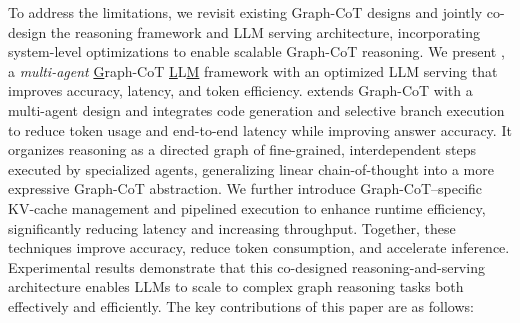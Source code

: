 %
To address the limitations, we revisit existing Graph-CoT designs and jointly co-design the reasoning framework and LLM serving architecture, incorporating system-level optimizations to enable scalable Graph-CoT reasoning.
%
We present \textbf{\projectname}, a \textit{multi-agent} \underline{G}raph-CoT \underline{L}L\underline{M} framework with an optimized LLM serving that improves accuracy, latency, and token efficiency. 
%
\projectname extends Graph-CoT with a multi-agent design and integrates code generation and selective branch execution to reduce token usage and end-to-end latency while improving answer accuracy. 
%
It organizes reasoning as a directed graph of fine-grained, interdependent steps executed by specialized agents, generalizing linear chain-of-thought into a more expressive Graph-CoT abstraction. 
%
We further introduce Graph-CoT–specific KV-cache management and pipelined execution to enhance runtime efficiency, significantly reducing latency and increasing throughput. 
%
Together, these techniques improve accuracy, reduce token consumption, and accelerate inference. Experimental results demonstrate that this co-designed reasoning-and-serving architecture enables LLMs to scale to complex graph reasoning tasks both effectively and efficiently.
%
The key contributions of this paper are as follows:




